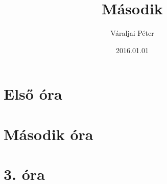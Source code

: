 \documentclass[a4papper, 12pt]{report}
\title{Második}
\author{Váraljai Péter}
\date{2016.01.01}
\begin{document}
	\maketitle
	\tableofcontents
	\chapter{Első óra}
	\chapter{Második óra}
	\chapter{3. óra}
	
	
	
\end{document}
